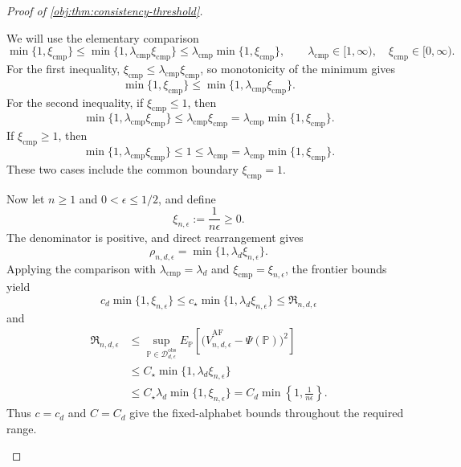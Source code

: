 \begin{proof}[Proof of \cref{obj:thm:consistency-threshold}]
\begin{enumerate}
We will use the elementary comparison
\[
\min\{1,\xi_{\mathrm{cmp}}\}
\le \min\{1,\lambda_{\mathrm{cmp}}\xi_{\mathrm{cmp}}\}
\le \lambda_{\mathrm{cmp}}\min\{1,\xi_{\mathrm{cmp}}\},
\qquad
\lambda_{\mathrm{cmp}}\in[1,\infty),\quad
\xi_{\mathrm{cmp}}\in[0,\infty).
\]
For the first inequality,
\(\xi_{\mathrm{cmp}}\le\lambda_{\mathrm{cmp}}\xi_{\mathrm{cmp}}\), so monotonicity of the minimum gives
\[
\min\{1,\xi_{\mathrm{cmp}}\}
\le\min\{1,\lambda_{\mathrm{cmp}}\xi_{\mathrm{cmp}}\}.
\]
For the second inequality, if \(\xi_{\mathrm{cmp}}\le1\), then
\[
\min\{1,\lambda_{\mathrm{cmp}}\xi_{\mathrm{cmp}}\}
\le\lambda_{\mathrm{cmp}}\xi_{\mathrm{cmp}}
=\lambda_{\mathrm{cmp}}\min\{1,\xi_{\mathrm{cmp}}\}.
\]
If \(\xi_{\mathrm{cmp}}\ge1\), then
\[
\min\{1,\lambda_{\mathrm{cmp}}\xi_{\mathrm{cmp}}\}
\le1\le\lambda_{\mathrm{cmp}}
=\lambda_{\mathrm{cmp}}\min\{1,\xi_{\mathrm{cmp}}\}.
\]
These two cases include the common boundary \(\xi_{\mathrm{cmp}}=1\).

Now let \(n\ge1\) and \(0<\epsilon\le1/2\), and define
\[
\xi_{n,\epsilon}:=\frac{1}{n\epsilon}\ge0.
\]
The denominator is positive, and direct rearrangement gives
\[
\rho_{n,d,\epsilon}
=\min\{1,\lambda_d\xi_{n,\epsilon}\}.
\]
Applying the comparison with
\(\lambda_{\mathrm{cmp}}=\lambda_d\) and
\(\xi_{\mathrm{cmp}}=\xi_{n,\epsilon}\), the frontier bounds yield
\[
c_d\min\{1,\xi_{n,\epsilon}\}
\le c_\star\min\{1,\lambda_d\xi_{n,\epsilon}\}
\le\mathfrak R_{n,d,\epsilon}
\]
and
\[
\begin{aligned}
\mathfrak R_{n,d,\epsilon}
&\le
\sup_{\mathbb P\in\mathcal D_{d,\epsilon}^{\mathrm{obs}}}
E_{\mathbb P}\!\left[
\bigl(\widehat V_{n,d,\epsilon}^{\mathrm{AF}}-\Psi(\mathbb P)\bigr)^2
\right]\\
&\le C_\star\min\{1,\lambda_d\xi_{n,\epsilon}\}\\
&\le C_\star\lambda_d\min\{1,\xi_{n,\epsilon}\}
=C_d\min\left\{1,\frac{1}{n\epsilon}\right\}.
\end{aligned}
\]
Thus \(c=c_d\) and \(C=C_d\) give the fixed-alphabet bounds throughout the required range.


\end{enumerate}
\end{proof}
